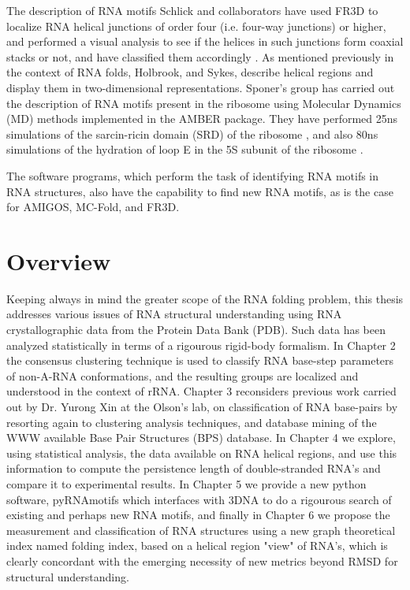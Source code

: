 The description of RNA motifs Schlick and collaborators have used FR3D
to  localize  RNA helical  junctions  of  order  four (i.e.   four-way
junctions) or  higher, and performed a  visual analysis to  see if the
helices  in  such junctions  form  coaxial  stacks  or not,  and  have
classified   them   accordingly   \cite{laing2009,  laing2009a}.    As
mentioned previously in the context of RNA folds, Holbrook, and Sykes,
describe   helical  regions  and   display  them   in  two-dimensional
representations. Sponer's group has carried out the description of RNA
motifs present  in the ribosome using Molecular  Dynamics (MD) methods
implemented  in   the  AMBER   package.   They  have   performed  25ns
simulations  of   the  sarcin-ricin  domain  (SRD)   of  the  ribosome
\cite{spackova2006},  and also  80ns simulations  of the  hydration of
loop E in the 5S subunit of the ribosome \cite{reblova2003}.

The software programs, which perform the task of identifying RNA motifs
in RNA structures, also have the capability to find new RNA motifs, as is
the case for AMIGOS, MC-Fold, and FR3D.

\section{Overview}
Keeping always in  mind the greater scope of  the RNA folding problem,
this thesis  addresses various issues of  RNA structural understanding
using RNA crystallographic data from the Protein Data Bank (PDB). Such
data  has been  analyzed statistically  in terms  of a rigourous
rigid-body formalism.  In Chapter 2 the consensus clustering technique
is   used  to   classify   RNA  base-step   parameters  of   non-A-RNA
conformations, and  the resulting groups are  localized and understood
in the context  of rRNA.  Chapter 3 reconsiders  previous work carried
out by  Dr. Yurong Xin  at the Olson's  lab, on classification  of RNA
base-pairs by  resorting again to clustering  analysis techniques, and
database  mining  of the  WWW  available  Base  Pair Structures  (BPS)
database.  In  Chapter 4 we  explore, using statistical  analysis, the
data available  on RNA  helical regions, and  use this  information to
compute the persistence length of double-stranded RNA's and compare it
to  experimental  results.  In  Chapter  5 we  provide  a  new  python
software,  pyRNAmotifs which interfaces  with 3DNA  to do  a rigourous
search of existing and perhaps  new RNA motifs, and finally in Chapter
6  we propose  the measurement  and classification  of  RNA structures
using a  new graph theoretical index  named folding index,  based on a
helical region "view"  of RNA's, which is clearly  concordant with the
emerging  necessity   of  new  metrics  beyond   RMSD  for  structural
understanding.


